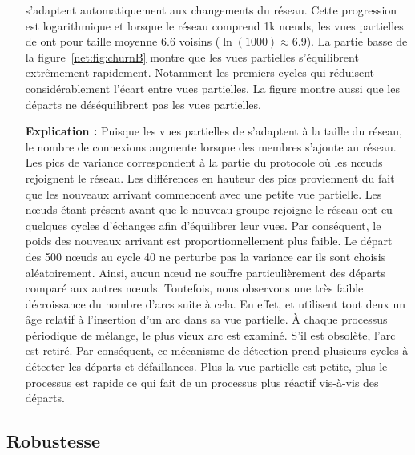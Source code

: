 \begin{itemize}
  s'adaptent automatiquement aux changements du réseau. Cette progression est
  logarithmique et lorsque le réseau comprend 1k nœuds, les vues partielles de
  \SPRAY ont pour taille moyenne 6.6 voisins ($\ln(1000)\approx6.9$). La partie
  basse de la figure~\ref{net:fig:churnB} montre que les vues partielles
  s'équilibrent extrêmement rapidement. Notamment les premiers cycles qui
  réduisent considérablement l'écart entre vues partielles. La figure montre
  aussi que les départs ne déséquilibrent pas les vues partielles.
\item [\textbf{Explication :}] Puisque les vues partielles de \SPRAY s'adaptent
  à la taille du réseau, le nombre de connexions augmente lorsque des membres
  s'ajoute au réseau. Les pics de variance correspondent à la partie du
  protocole où les nœuds rejoignent le réseau. Les différences en hauteur des
  pics proviennent du fait que les nouveaux arrivant commencent avec une petite
  vue partielle. Les nœuds étant présent avant que le nouveau groupe rejoigne le
  réseau ont eu quelques cycles d'échanges afin d'équilibrer leur vues. Par
  conséquent, le poids des nouveaux arrivant est proportionnellement plus
  faible. Le départ des 500 nœuds au cycle 40 ne perturbe pas la variance car
  ils sont choisis aléatoirement. Ainsi, aucun nœud ne souffre particulièrement
  des départs comparé aux autres nœuds. Toutefois, nous observons une très
  faible décroissance du nombre d'arcs suite à cela. En effet, \CYCLON et \SPRAY
  utilisent tout deux un âge relatif à l'insertion d'un arc dans sa vue
  partielle. À chaque processus périodique de mélange, le plus vieux arc est
  examiné. S'il est obsolète, l'arc est retiré. Par conséquent, ce mécanisme de
  détection prend plusieurs cycles à détecter les départs et défaillances. Plus
  la vue partielle est petite, plus le processus est rapide ce qui fait de
  \SPRAY un processus plus réactif vis-à-vis des départs.
\end{itemize}

\subsection{Robustesse}
\label{net:subsec:robustness}

